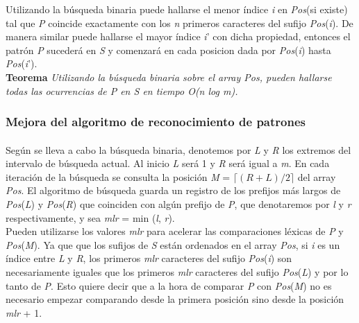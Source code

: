 \documentclass[es]{ifirak}
\begin{document}
Utilizando la búsqueda binaria puede hallarse el menor índice \textit{i} en \textit{Pos}(si existe) tal que \textit{P} coincide exactamente con los \textit{n} primeros caracteres del sufijo \textit{Pos}(\textit{i}). De manera similar puede hallarse el mayor índice \textit{i}' con dicha propiedad, entonces el patrón \textit{P} sucederá en \textit{S} y comenzará en cada posicion dada por \textit{Pos}(\textit{i}) hasta \textit{Pos}(\textit{i}').\\

\textbf{Teorema} \textit{Utilizando la búsqueda binaria sobre el array \textit{Pos}, pueden hallarse todas las ocurrencias de \textit{P} en \textit{S} en tiempo O(n log m).}\\

\subsubsection{Mejora del algoritmo de reconocimiento de patrones}
\paragraph{}
Según se lleva a cabo la búsqueda binaria, denotemos por \textit{L} y \textit{R} los extremos del intervalo de búsqueda actual. Al inicio \textit{L} será 1 y \textit{R} será igual a \textit{m}. En cada iteración de la búsqueda se consulta la posición \textit{M} = $ \lceil(R + L)/2\rceil$ del array \textit{Pos}. El algoritmo de búsqueda guarda un registro de los prefijos más largos de \textit{Pos}(\textit{L}) y \textit{Pos}(\textit{R}) que coinciden con algún prefijo de \textit{P}, que denotaremos por \textit{l} y \textit{r} respectivamente, y sea \textit{mlr} = min (\textit{l}, \textit{r}).\\

Pueden utilizarse los valores \textit{mlr} para acelerar las comparaciones léxicas de \textit{P} y \textit{Pos}(\textit{M}). Ya que que los sufijos de \textit{S} están ordenados en el array \textit{Pos}, si \textit{i} es un índice entre \textit{L} y \textit{R}, los primeros \textit{mlr} caracteres del sufijo \textit{Pos}(\textit{i}) son necesariamente iguales que los primeros \textit{mlr} caracteres del sufijo \textit{Pos}(\textit{L}) y por lo tanto de \textit{P}. Esto quiere decir que a la hora de comparar \textit{P} con \textit{Pos}(\textit{M}) no es necesario empezar comparando desde la primera posición sino desde la posición \textit{mlr} + 1.\\
\end{document}
